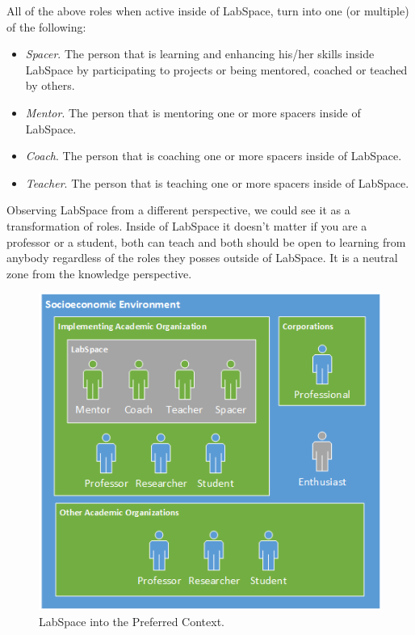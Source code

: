 \documentclass[a4paper, 11pt]{article}
\begin{document}
All of the above roles when active inside of LabSpace, turn into one (or multiple) of the following:

\begin{itemize}[noitemsep]
    \item \textit{Spacer}. The person that is learning and enhancing his/her skills inside LabSpace by participating to projects or being mentored, coached or teached by others.
    \item \textit{Mentor}. The person that is mentoring one or more spacers inside of LabSpace.
    \item \textit{Coach}. The person that is coaching one or more spacers inside of LabSpace.
    \item \textit{Teacher}. The person that is teaching one or more spacers inside of LabSpace.
\end{itemize}

Observing LabSpace from a different perspective, we could see it as a transformation of roles. Inside of LabSpace it doesn't matter if you are a professor or a student, both can teach and both should be open to learning from anybody regardless of the roles they posses outside of LabSpace. It is a neutral zone from the knowledge perspective.

\begin{figure}[h!]
  \begin{center}
    \includegraphics[width=\textwidth,height=\textheight,keepaspectratio]{imagery/ls_context.png}
    \caption{LabSpace into the Preferred Context.}
    \label{fig:ls_env}
  \end{center}
\end{figure}
\end{document}
